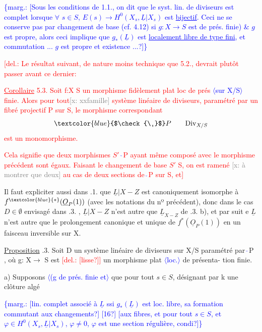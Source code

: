 \documentclass[11pt]{article}
\newcommand{\hand}[1]{\textcolor{blue}{#1}}
\let\over\relax
\newcommand{\over}[2]{\textcolor{gray}{#1}\textcolor{blue}{\ensuremath{^{\!\nearrow}}#2}}
\newcommand{\inserted}[2][]{\textcolor{blue}{$\langle$#2$\rangle$}}
\newcommand{\margin}[1]{\textcolor{blue}{\{\textsf{marg.:} #1\}}}
\newcommand{\deleted}[1]{\textcolor{red}{[\textsf{del.:} #1]}}
\newcommand{\xout}[1]{\textcolor{gray}{[\textsf{x:} #1]}}
\newcommand{\uline}[1]{\underline{#1}}
\newcommand{\unsure}[1]{[#1?]}
\begin{document}
\margin{\unsure{Sous les conditions de 1.1., on dit que le syst. lin. de diviseurs est complet lorsque $\forall$ $s \in S$, $E(s) \rightarrow H^0(X_s, \underline{L}|X_s)$ est \uline{bijectif}. Ceci ne se conserve pas par changement de base (cf. 4.12) si $g : X \rightarrow S$ est de prés. finie) \& $g$ est propre, alors ceci implique que $g_*(\underline{L})$ est \uline{localement libre de type fini}, et commutation ... $g$ est propre et existence ...}}
\deleted{Le résultat suivant, de nature moins technique que 5.2., devrait
plutôt passer avant ce dernier:

\uline{Corollaire} 5.3. Soit f:X \quad S un morphisme fidèlement plat loc de prés
\inserted[typed]{sur X/S}
finie. Alors pour tout\xout{xxfamille} système linéaire de diviseurs, paramétré
par un fibré projectif P sur S, le morphisme correspondant
\[ \hand{$\check{\ }$}P \qquad \mathrm{Div}_{X/S} \]
est un monomorphisme.

Cela signifie que deux morphismes $S'$ \quad \hand{$\check{\ }$}P ayant même composé avec
le morphisme précédent sont égaux. Faisant le changement de base $S'$ \quad S,
on est ramené \xout{à montrer que deux} au cas de deux sections de \hand{$\check{\ }$}P sur S,
et}

Il faut expliciter aussi dans \over{5}{4}.1. que $\underline{L}|X-Z$ est canoniquement
isomorphe à $f^{\hand{*}}(\underline{O}_P(1))$ (avec les notations du nº précédent), donc dans
le cas $D \in \emptyset$ envisagé dans \over{5}{4}.3. , $\underline{L}|X-Z$ n'est autre que $\underline{L}_{X-Z}$
de \over{5}{4}.3. b), et par suit e $\underline{L}$ n'est autre que le prolongement canonique et
unique de $f^*(\underline{O}_P(1))$ en un faisceau inversible sur X.

\uline{Proposition} \over{5}{4}.3. Soit D un système linéaire de diviseurs sur X/S
paramétré par \hand{$\check{\ }$}P , où g: X$\longrightarrow$ S est \deleted{\unsure{lisse}} un morphisme plat \inserted{loc.} de présenta-%
tion finie.

a) Supposons \inserted{(g de prés. finie et} que pour tout $s \in S$, désignant par k une clôture algé

\margin{\unsure{lin. complet associé à $\underline{L}$ ssi $g_*(\underline{L})$ est loc. libre, sa formation commutant aux changements} \unsure{16} \unsure{aux fibres, et pour tout $s \in S$, et $\varphi \in H^0(X_s, \underline{L}|X_s)$, $\varphi \neq 0$, $\varphi$ est une section régulière, condi}}
\end{document}
